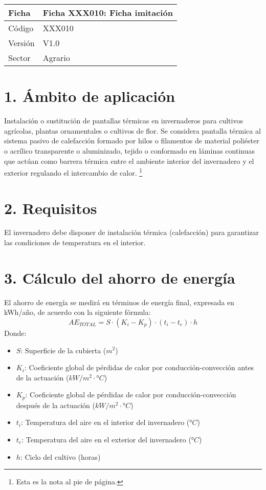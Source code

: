 \documentclass[12pt]{article}
\renewcommand{\baselinestretch}{1.4}  %
\begin{document}
\justifying

\begin{Form}


\setlength{\tabcolsep}{10pt} %

\noindent
\begin{table}[h!]
    \begin{tabular}{|>{\centering\arraybackslash}p{4cm}|>{\centering\arraybackslash}p{11cm}|}
    \hline
    \textbf{Ficha} & \textbf{Ficha XXX010: Ficha imitación} \\ \hline
    Código & XXX010 \\ \hline
    Versión & V1.0 \\ \hline
    Sector & Agrario \\ \hline
    \end{tabular}
\end{table}



\section*{1. Ámbito de aplicación}
Instalación o sustitución de pantallas térmicas en invernaderos para cultivos agrícolas, plantas ornamentales o cultivos de flor. Se considera pantalla térmica al sistema pasivo de calefacción formado por hilos o filamentos de material poliéster o acrílico transparente o aluminizado, tejido o conformado en láminas continuas que actúan como barrera térmica entre el ambiente interior del invernadero y el exterior regulando el intercambio de calor.
\footnote{Esta es la nota al pie de página.}
\section*{2. Requisitos}
El invernadero debe disponer de instalación térmica (calefacción) para garantizar las condiciones de temperatura en el interior.
\section*{3. Cálculo del ahorro de energía}
El ahorro de energía se medirá en términos de energía final, expresada en kWh/año, de acuerdo con la siguiente fórmula:
\[
AE_{TOTAL} = S \cdot (K_i - K_p) \cdot (t_i - t_e) \cdot h
\]
Donde:
\begin{itemize}
    \item $S$: Superficie de la cubierta ($m^2$)
    \item $K_i$: Coeficiente global de pérdidas de calor por conducción-convección antes de la actuación ($kW/m^2 \cdot °C$)
    \item $K_p$: Coeficiente global de pérdidas de calor por conducción-convección después de la actuación ($kW/m^2 \cdot °C$)
    \item $t_i$: Temperatura del aire en el interior del invernadero ($°C$)
    \item $t_e$: Temperatura del aire en el exterior del invernadero ($°C$)
    \item $h$: Ciclo del cultivo (horas)
\end{itemize}


\end{Form}
\end{document}
